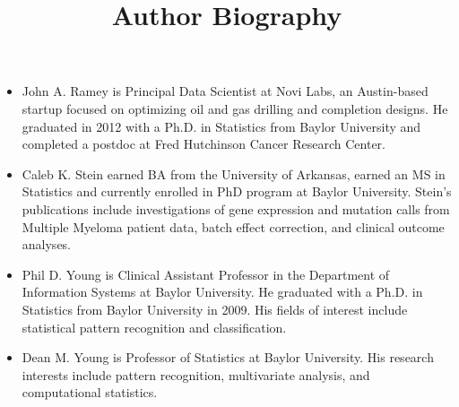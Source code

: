 \documentclass{elsarticle}
\begin{document}
\title{Author Biography}

\maketitle

\begin{itemize}
  \item John A. Ramey is Principal Data Scientist at Novi Labs, an Austin-based startup focused on optimizing oil and gas drilling and completion designs. He graduated in 2012 with a Ph.D. in Statistics from Baylor University and completed a postdoc at Fred Hutchinson Cancer Research Center.
  \item Caleb K. Stein earned BA from the University of Arkansas, earned an MS in Statistics and currently enrolled in PhD program at Baylor University. Stein's publications include investigations of gene expression and mutation calls from Multiple Myeloma patient data, batch effect correction, and clinical outcome analyses.
  \item Phil D. Young is Clinical Assistant Professor in the Department of Information Systems at Baylor University. He graduated with a Ph.D. in Statistics from Baylor University in 2009. His fields of interest include statistical pattern recognition and classification.
  \item Dean M. Young is Professor of Statistics at Baylor University. His research interests include pattern recognition, multivariate analysis, and computational statistics.
\end{itemize}
\end{document}
